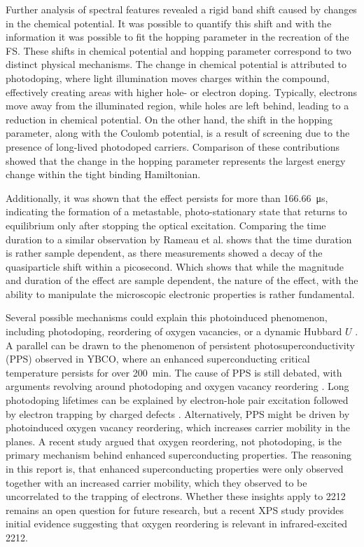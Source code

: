Further analysis of spectral features revealed a rigid band shift caused by changes in the chemical potential.
It was possible to quantify this shift and with the information it was possible to fit the hopping parameter in the recreation of the FS.
These shifts in chemical potential and hopping parameter correspond to two distinct physical mechanisms.
The change in chemical potential is attributed to photodoping, where light illumination moves charges within the compound, effectively creating areas with higher hole- or electron doping.
Typically, electrons move away from the illuminated region, while holes are left behind, leading to a reduction in chemical potential.
On the other hand, the shift in the hopping parameter, along with the Coulomb potential, is a result of screening due to the presence of long-lived photodoped carriers.
Comparison of these contributions showed that the change in the hopping parameter represents the largest energy change within the tight binding Hamiltonian.

Additionally, it was shown that the effect persists for more than \qty{166.66}{\micro\second}, indicating the formation of a metastable, photo-stationary state that returns to equilibrium only after stopping the optical excitation.
Comparing the time duration to a similar observation by Rameau et al. \cite{rameau_photoinduced_2014} shows that the time duration is rather sample dependent, as there measurements showed a decay of the quasiparticle shift within a picosecond.
Which shows that while the magnitude and duration of the effect are sample dependent, the nature of the effect, with the ability to manipulate the microscopic electronic properties is rather fundamental.

Several possible mechanisms could explain this photoinduced phenomenon, including photodoping, reordering of oxygen vacancies, or a dynamic Hubbard $U$ \cite{baykusheva_ultrafast_2022}.
A parallel can be drawn to the phenomenon of persistent photosuperconductivity (PPS) observed in YBCO, where an enhanced superconducting critical temperature persists for over \qty{200}{\minute}.
The cause of PPS is still debated, with arguments revolving around photodoping and oxygen vacancy reordering \cite{gilabert_photodoping_2000}.
Long photodoping lifetimes can be explained by electron-hole pair excitation followed by electron trapping by charged defects \cite{el_hage_disentangling_2024, kudinov_persistent_1993, kudinov_mechanisms_1994}.
Alternatively, PPS might be driven by photoinduced oxygen vacancy reordering, which increases carrier mobility in the  planes.
A recent study \cite{el_hage_disentangling_2024} argued that oxygen reordering, not photodoping, is the primary mechanism behind enhanced superconducting properties.
The reasoning in this report is, that enhanced superconducting properties were only observed together with an increased carrier mobility, which they observed to be uncorrelated to the trapping of electrons.
Whether these insights apply to 2212 remains an open question for future research, but a recent XPS study \cite{puntel_out--equilibrium_2024} provides initial evidence suggesting that oxygen reordering is relevant in infrared-excited 2212.

